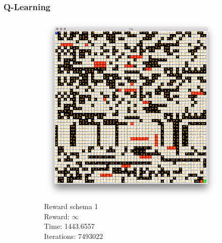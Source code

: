 \documentclass[a4paper,10pt]{article}
\begin{document}
\subsubsection{Q-Learning}
\begin{figure}[H]
        \centering
        \begin{subfigure}[b]{0.3\textwidth}
                \includegraphics[width=\textwidth]{figures/50x50_q_r1.png}
                \caption{Reward schema 1\\ 
                Reward:  $\infty$ \\
                Time:  1443.6557 \\
                Iterations:  7493022 }
                \label{fig:qr1}
        \end{subfigure}%
        ~ %
        \begin{subfigure}[b]{0.3\textwidth}

\end{subfigure}
\end{figure}
\end{document}
